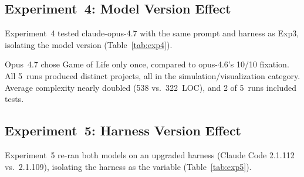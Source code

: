 \documentclass{article}
\begin{document}
\subsection{Experiment~4: Model Version Effect}

Experiment~4 tested claude-opus-4.7 with the same prompt and
harness as Exp3, isolating the model version
(Table~\ref{tab:exp4}).

\begin{table}[t]
\caption{Experiment~4: opus-4.7 (harness 2.1.109).}
\label{tab:exp4}
\small{}
\end{table}

Opus~4.7 chose Game of Life only once, compared to opus-4.6's
10/10 fixation. All 5~runs produced distinct projects, all in the
simulation/visualization category. Average complexity nearly
doubled (538 vs.\ 322~LOC), and 2 of 5~runs included tests.

\subsection{Experiment~5: Harness Version Effect}

Experiment~5 re-ran both models on an upgraded harness (Claude
Code 2.1.112 vs.\ 2.1.109), isolating the harness as the
variable (Table~\ref{tab:exp5}).
\end{document}
